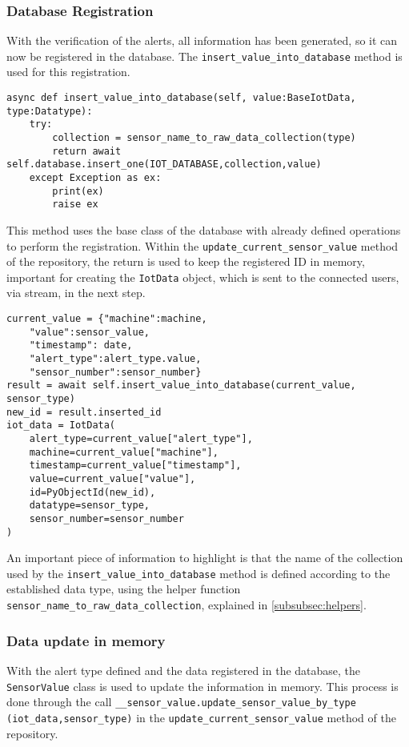 \subsubsection{Database Registration}

With the verification of the alerts, all information has been generated, so it can now be registered in the database. The \texttt{insert\_value\_into\_database} method is used for this registration.

\begin{verbatim}
async def insert_value_into_database(self, value:BaseIotData, type:Datatype):
    try:
        collection = sensor_name_to_raw_data_collection(type)
        return await self.database.insert_one(IOT_DATABASE,collection,value)
    except Exception as ex:
        print(ex)
        raise ex
\end{verbatim}

This method uses the base class of the database with already defined operations to perform the registration. Within the \texttt{update\_current\_sensor\_value} method of the repository, the return is used to keep the registered ID in memory, important for creating the \texttt{IotData} object, which is sent to the connected users, via stream, in the next step.

\begin{verbatim}
current_value = {"machine":machine,
    "value":sensor_value,
    "timestamp": date,
    "alert_type":alert_type.value,
    "sensor_number":sensor_number}
result = await self.insert_value_into_database(current_value, sensor_type)
new_id = result.inserted_id
iot_data = IotData(
    alert_type=current_value["alert_type"],
    machine=current_value["machine"],
    timestamp=current_value["timestamp"],
    value=current_value["value"],
    id=PyObjectId(new_id),
    datatype=sensor_type,
    sensor_number=sensor_number
)
\end{verbatim}

An important piece of information to highlight is that the name of the collection used by the \texttt{insert\_value\_into\_database} method is defined according to the established data type, using the helper function \texttt{sensor\_name\_to\_raw\_data\_collection}, explained in \ref{subsubsec:helpers}.

\subsubsection{Data update in memory}

With the alert type defined and the data registered in the database, the \texttt{SensorValue} class is used to update the information in memory. This process is done through the call \texttt{\_\_sensor\_value.update\_sensor\_value\_by\_type (iot\_data,sensor\_type)} in the \texttt{update\_current\_sensor\_value} method of the repository.

